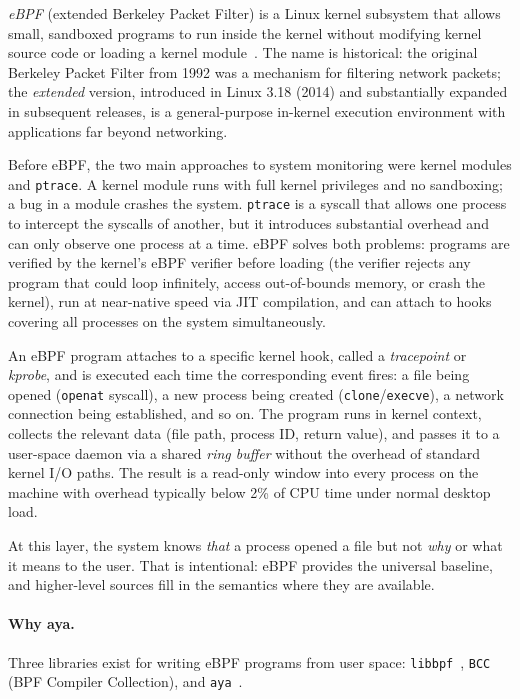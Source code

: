 \emph{eBPF} (extended Berkeley Packet Filter) is a Linux kernel subsystem that
allows small, sandboxed programs to run inside the kernel without modifying
kernel source code or loading a kernel module~\cite{ebpf:io}. The name is
historical: the original Berkeley Packet Filter from 1992 was a mechanism for
filtering network packets; the \emph{extended} version, introduced in Linux
3.18 (2014) and substantially expanded in subsequent releases, is a
general-purpose in-kernel execution environment with applications far beyond
networking.

Before eBPF, the two main approaches to system monitoring were kernel modules
and \texttt{ptrace}. A kernel module runs with full kernel privileges and no
sandboxing; a bug in a module crashes the system. \texttt{ptrace} is a syscall
that allows one process to intercept the syscalls of another, but it introduces
substantial overhead and can only observe one process at a time. eBPF solves
both problems: programs are verified by the kernel's eBPF verifier before
loading (the verifier rejects any program that could loop infinitely, access
out-of-bounds memory, or crash the kernel), run at near-native speed via JIT
compilation, and can attach to hooks covering all processes on the system
simultaneously.

An eBPF program attaches to a specific kernel hook, called a \emph{tracepoint}
or \emph{kprobe}, and is executed each time the corresponding event fires: a
file being opened (\texttt{openat} syscall), a new process being created
(\texttt{clone}/\texttt{execve}), a network connection being established, and
so on. The program runs in kernel context, collects the relevant data (file
path, process ID, return value), and passes it to a user-space daemon via a
shared \emph{ring buffer} without the overhead of standard kernel I/O paths.
The result is a read-only window into every process on the machine with overhead
typically below 2\% of CPU time under normal desktop load.

At this layer, the system knows \emph{that} a process opened a file but not
\emph{why} or what it means to the user. That is intentional: eBPF provides the
universal baseline, and higher-level sources fill in the semantics where they
are available.

\paragraph{Why aya.}
Three libraries exist for writing eBPF programs from user space:
\texttt{libbpf}~\cite{libbpf}, \texttt{BCC} (BPF Compiler Collection), and
\texttt{aya}~\cite{aya}.

